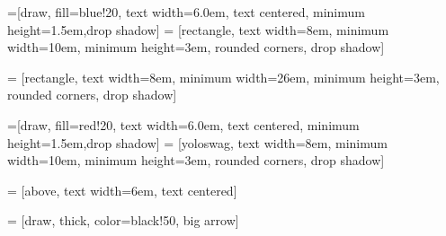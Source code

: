 \usetikzlibrary{shadows,arrows}
\usetikzlibrary{decorations.markings}


=[draw, fill=blue!20, text width=6.0em, text centered,
  minimum height=1.5em,drop shadow]
 = [rectangle, text width=8em, minimum width=10em,
  minimum height=3em, rounded corners, drop shadow]

 = [rectangle, text width=8em, minimum width=26em,
  minimum height=3em, rounded corners, drop shadow]

=[draw, fill=red!20, text width=6.0em, text centered,
  minimum height=1.5em,drop shadow]
 = [yoloswag, text width=8em, minimum width=10em,
  minimum height=3em, rounded corners, drop shadow]

 = [above, text width=6em, text centered]

 = [draw, thick, color=black!50, big arrow]

\newcommand{\practica}[2]{node (p#1) [practica] {#2}}
\newcommand{\redBox}[2]{node (p#1) [redBox] {#2}}
\newcommand{\longhorse}[2]{node (p#1) [long] {#2}}
\newcommand{\implemented}[2]{node (p#1) [interface] {#2}}
 
